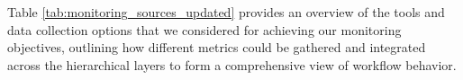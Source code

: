 Table \ref{tab:monitoring_sources_updated} provides an overview of the tools and data collection options that we considered for achieving our monitoring objectives, outlining how different metrics could be gathered and integrated across the hierarchical layers to form a comprehensive view of workflow behavior.

\begin{table}[H]
    \centering
    \renewcommand{\arraystretch}{1.15}
\end{table}
